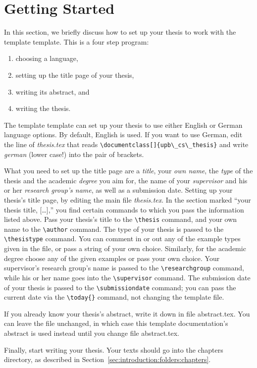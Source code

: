 \section{Getting Started}
\label{sec:introduction:start}

In this section, we briefly discuss how to set up your thesis to work with the
\acs{template} template.
This is a four step program:
\begin{enumerate}
	\item choosing a language,
	\item setting up the title page of your thesis,
	\item writing its abstract, and 
	\item writing the thesis.
\end{enumerate}

The \acs{template} template can set up your thesis to use either English or
German language options.
By default, English is used.
If you want to use German, edit the line of \emph{thesis.tex} that reads
\verb+\documentclass[]{upb\_cs\_thesis}+ and write \emph{german} (lower case!)
into the pair of brackets.

What you need to set up the title page are a \emph{title}, your \emph{own
name}, the \emph{type} of the thesis and the academic \emph{degree} you aim
for, the name of your \emph{supervisor} and his or her \emph{research group's
name}, as well as a submission date.
Setting up your thesis's title page, by editing the main file
\emph{thesis.tex}. 
In the section marked ``your thesis title, [\dots],'' you find certain
commands to which you pass the information listed above.
Pass your thesis's title to the \verb+\thesis+ command, and your own name to
the \verb+\author+ command.
The type of your thesis is passed to the \verb+\thesistype+ command.
You can comment in or out any of the example types given in the file, or pass
a string of your own choice.
Similarly, for the academic degree choose any of the given examples or pass
your own choice.
Your supervisor's research group's name is passed to the \verb+\researchgroup+
command, while his or her name goes into the \verb+\supervisor+ command.
The submission date of your thesis is passed to the \verb+\submissiondate+
command; you can pass the current date via the \verb+\today{}+ command, \ie{}
not changing the template file.

If you already know your thesis's abstract, write it down in file
\mbox{abstract.tex}.
You can leave the file unchanged, in which case this template documentation's
abstract is used instead until you change file \mbox{abstract.tex}.

Finally, start writing your thesis.
Your texts should go into the chapters directory, as described in
Section~\ref{sec:introduction:folders:chapters}.


